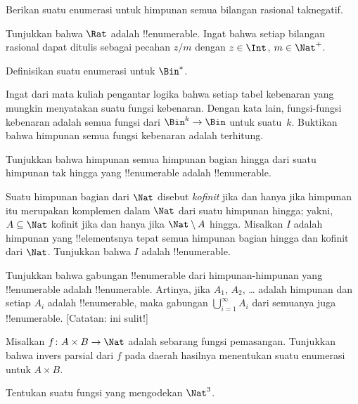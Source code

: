 \documentclass[../../../include/open-logic-section]{subfiles}
\begin{document}
\begin{prob}
Berikan suatu enumerasi untuk himpunan semua bilangan rasional taknegatif.
\end{prob}

\begin{prob}
Tunjukkan bahwa $\Rat$ adalah !!{enumerable}. Ingat bahwa setiap bilangan
rasional dapat ditulis sebagai pecahan $z/m$ dengan $z \in \Int$, $m \in \Nat^+$.
\end{prob}

\begin{prob}
Definisikan suatu enumerasi untuk $\Bin^*$.
\end{prob}

\begin{prob}
Ingat dari mata kuliah pengantar logika bahwa setiap tabel kebenaran yang
mungkin menyatakan suatu fungsi kebenaran. Dengan kata lain, fungsi-fungsi
kebenaran adalah semua fungsi dari $\Bin^k \to \Bin$ untuk suatu~$k$.
Buktikan bahwa himpunan semua fungsi kebenaran adalah terhitung.
\end{prob}

\begin{prob}
Tunjukkan bahwa himpunan semua himpunan bagian hingga dari suatu himpunan
tak hingga yang !!{enumerable} adalah !!{enumerable}.
\end{prob}

\begin{prob}
Suatu himpunan bagian dari $\Nat$ disebut \emph{kofinit} jika dan hanya jika
himpunan itu merupakan komplemen dalam $\Nat$ dari suatu himpunan hingga;
yakni, $A \subseteq \Nat$ kofinit jika dan hanya jika $\Nat\setminus A$
hingga. Misalkan $I$ adalah himpunan yang !!{element}snya tepat semua himpunan
bagian hingga dan kofinit dari $\Nat$. Tunjukkan bahwa $I$ adalah
!!{enumerable}.
\end{prob}

\begin{prob}
Tunjukkan bahwa gabungan !!{enumerable} dari himpunan-himpunan yang !!{enumerable}
adalah !!{enumerable}. Artinya, jika $A_1$, $A_2$, \dots{} adalah himpunan dan
setiap $A_i$ adalah !!{enumerable}, maka gabungan $\bigcup_{i=1}^\infty A_i$
dari semuanya juga !!{enumerable}. [Catatan: ini sulit!]
\end{prob}

\begin{prob}
Misalkan $f \colon A \times B \to \Nat$ adalah sebarang fungsi pemasangan.
Tunjukkan bahwa invers parsial dari $f$ pada daerah hasilnya menentukan suatu
enumerasi untuk $A \times B$.
\end{prob}

\begin{prob}
Tentukan suatu fungsi yang mengodekan $\Nat^3$.
\end{prob}
\end{document}
